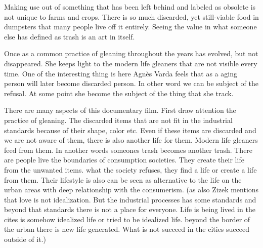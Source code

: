 Making use out of something that has been left behind and labeled as obsolete is not unique to farms and crops. There is so much discarded, yet still-viable food in dumpsters that many people live off it entirely. Seeing the value in what someone else has defined as trash is an art in itself.

Once as a common practice of gleaning throughout the years has evolved, but not disappeared. She keeps light to the modern life gleaners that are not visible every time. One of the interesting thing is here Agnès Varda feels that as a aging person will later become discarded person. In other word we can be subject of the refusal. At some point she become the subject of the thing that she track. 

There are many aspects of this documentary film. First draw attention the practice of gleaning. The discarded items that are not fit in the industrial standards because of their shape, color etc. Even if these items are discarded and we are not aware of them, there is also another life for them. Modern life gleaners feed from them. In another words someones trash becomes another trash. There are people live the boundaries of consumption societies. They create their life from the unwanted items. what the society refuses, they find a life or create a life from them. Their lifestyle is also can be seen as alternative to the life on the urban areas with deep relationship with the consumerism. (as also Zizek mentions that love is not idealization. But the industrial processes has some standards and beyond that standards there is not a place for everyone. Life is being lived in the cites is somehow idealized life or tried to be idealized life. beyond the border of the urban there is new life generated. What is not succeed in the cities succeed outside of it.)


